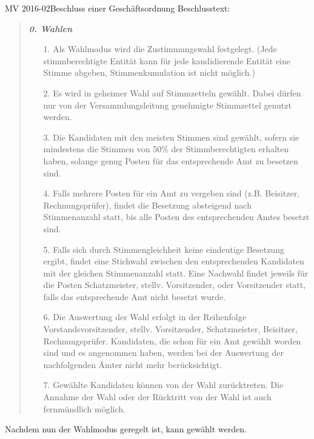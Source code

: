 \documentclass{s0minutes}
\begin{document}
\begin{resolution}{MV 2016-02}{}{Beschluss einer
  Geschäftsordnung}{}
  Beschlusstext:

  \begin{quote}
    \itshape
    \textbf{0. Wahlen}
    \begin{enumerate}
      \item[1.] Als Wahlmodus wird die Zustimmungswahl festgelegt. (Jede
        stimmberechtigte Entität kann für jede kandidierende Entität eine Stimme
        abgeben, Stimmenkumulation ist nicht möglich.)
      \item[2.] Es wird in geheimer Wahl auf Stimmzetteln gewählt. Dabei dürfen
        nur von der Versammlungsleitung genehmigte Stimmzettel genutzt werden.
      \item[3.] Die Kandidaten mit den meisten Stimmen sind gewählt, sofern sie
        mindestens die Stimmen von 50\% der Stimmberechtigten erhalten haben,
        solange genug Posten für das entsprechende Amt zu besetzen sind.
      \item[4.] Falls mehrere Posten für ein Amt zu vergeben sind (z.B.
        Beisitzer, Rechnungsprüfer), findet die Besetzung absteigend nach
        Stimmenanzahl statt, bis alle Posten des entsprechenden Amtes besetzt
        sind.
      \item[5.] Falls sich durch Stimmengleichheit keine eindeutige Besetzung
        ergibt, findet eine Stichwahl zwischen den entsprechenden Kandidaten mit
        der gleichen Stimmenanzahl statt. Eine Nachwahl findet jeweils für die
        Posten Schatzmeister, stellv. Vorsitzender, oder Vorsitzender statt,
        falls das entsprechende Amt nicht besetzt wurde.
      \item[6.] Die Auswertung der Wahl erfolgt in der Reihenfolge
        Vorstandsvorsitzender, stellv. Vorsitzender, Schatzmeister, Beisitzer,
        Rechnungsprüfer. Kandidaten, die schon für ein Amt gewählt worden sind
        und es angenommen haben, werden bei der Auswertung der nachfolgenden
        Ämter nicht mehr berücksichtigt.
      \item[7.] Gewählte Kandidaten können von der Wahl zurücktreten. Die
        Annahme der Wahl oder der Rücktritt von der Wahl ist auch fernmündlich
        möglich.
    \end{enumerate}
  \end{quote}
\end{resolution}

Nachdem nun der Wahlmodus geregelt ist, kann gewählt werden.
\end{document}
